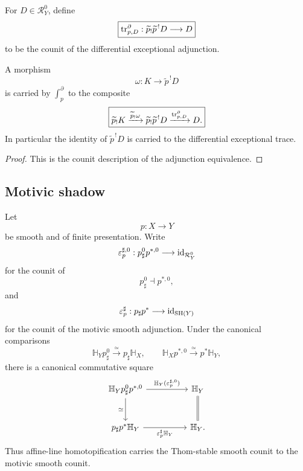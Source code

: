 \begin{definition}
\label{def:dr-int-differential-trace}
For \(D\in\mathcal R_Y^0\), define
\[
\boxed{
    \operatorname{tr}^{\partial}_{p,D}:
    \widetilde p_!\widetilde p^{\,!}D
    \longrightarrow
    D
}
\]
to be the counit of the differential exceptional adjunction.
\end{definition}

\begin{proposition}
\label{prop:dr-int-integration-by-trace}
A morphism
\[
    \omega:
    K\longrightarrow\widetilde p^{\,!}D
\]
is carried by \(\int_p^\partial\) to the composite
\[
\boxed{
    \widetilde p_!K
    \xrightarrow{\widetilde p_!\omega}
    \widetilde p_!\widetilde p^{\,!}D
    \xrightarrow{\operatorname{tr}^{\partial}_{p,D}}
    D.
}
\]
In particular the identity of \(\widetilde p^{\,!}D\) is carried to the
differential exceptional trace.
\end{proposition}

\begin{proof}
This is the counit description of the adjunction equivalence.
\end{proof}

\subsection{Motivic shadow}

\begin{lemma}
\label{lem:dr-int-smooth-counit-homotopification}
Let
\[
    p:X\longrightarrow Y
\]
be smooth and of finite presentation.  Write
\[
    \varepsilon_p^{\sharp,0}:
    p_\sharp^0p^{*,0}\longrightarrow\operatorname{id}_{\mathcal R_Y^0}
\]
for the counit of
\[
    p_\sharp^0\dashv p^{*,0},
\]
and
\[
    \varepsilon_p^\sharp:
    p_\sharp p^*\longrightarrow\operatorname{id}_{\mathrm{SH}(Y)}
\]
for the counit of the motivic smooth adjunction.  Under the canonical
comparisons
\[
    \mathbb H_Yp_\sharp^0
    \xrightarrow{\simeq}
    p_\sharp\mathbb H_X,
    \qquad
    \mathbb H_Xp^{*,0}
    \xrightarrow{\simeq}
    p^*\mathbb H_Y,
\]
there is a canonical commutative square
\[
\begin{tikzcd}[column sep=huge,row sep=large]
    \mathbb H_Yp_\sharp^0p^{*,0}
        \ar[r,"\mathbb H_Y(\varepsilon_p^{\sharp,0})"]
        \ar[d,"\simeq"']
    &
    \mathbb H_Y
        \ar[d,equal]
    \\
    p_\sharp p^*\mathbb H_Y
        \ar[r,"\varepsilon_p^\sharp\mathbb H_Y"']
    &
    \mathbb H_Y.
\end{tikzcd}
\]
Thus affine-line homotopification carries the Thom-stable smooth counit to
the motivic smooth counit.
\end{lemma}

